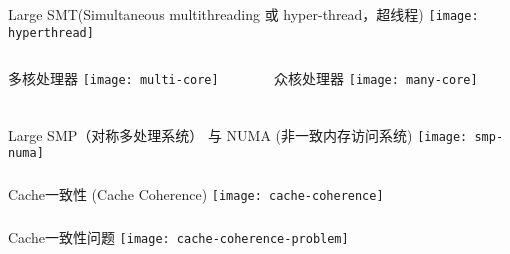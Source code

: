 \begin{frame}	
	\frametitle{}
	\centering
	Large 
	SMT(Simultaneous multithreading 或 hyper-thread，超线程)
	\texttt{[image: hyperthread]}
\end{frame}

\begin{frame}
	\begin{columns}
		\begin{column}{.5\textwidth}
			\Large
			多核处理器	
			\texttt{[image: multi-core]}
			
		\end{column}
		
		\begin{column}{.5\textwidth}
			\Large
			众核处理器
			\texttt{[image: many-core]}
			
		\end{column}
	\end{columns}
\end{frame}

\begin{frame}	
	\frametitle{}
	\centering
	Large 
	SMP（对称多处理系统） 与 NUMA (非一致内存访问系统)
	\texttt{[image: smp-numa]}
\end{frame}


\begin{frame}	
	\frametitle{}
	\centering
	\Large 
	Cache一致性 (Cache Coherence)
	\texttt{[image: cache-coherence]}
\end{frame}

\begin{frame}	
	\frametitle{}
	\centering
	\Large 
	Cache一致性问题
	\texttt{[image: cache-coherence-problem]}
\end{frame}











